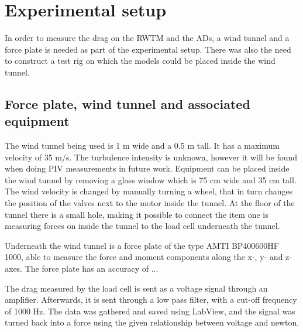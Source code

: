 \section{Experimental setup}

In order to measure the drag on the \gls{RWTM} and the \gls{AD}s, a wind tunnel and a force plate is needed as part of the experimental setup. There was also the need to construct a test rig on which the models could be placed inside the wind tunnel. 

\subsection{Force plate, wind tunnel and associated equipment}
The wind tunnel being used is 1 \si{\metre} wide and a 0.5 m tall. It has a maximum velocity of 35 m/s. The turbulence intensity is unknown, however it will be found when doing \gls{PIV} measurements in future work. Equipment can be placed inside the wind tunnel by removing a glass window which is 75 cm wide and 35 cm tall. The wind velocity is changed by manually turning a wheel, that in turn changes the position of the valves next to the motor inside the tunnel. At the floor of the tunnel there is a small hole, making it possible to connect the item one is measuring forces on inside the tunnel to the load cell underneath the tunnel.  


Underneath the wind tunnel is a force plate of the type AMTI BP400600HF 1000, able to measure the force and moment components along the x-, y- and z-axes. The force plate has an accuracy of ...  


The drag measured by the load cell is sent as a voltage signal through an amplifier. Afterwards, it is sent through a low pass filter, with a cut-off frequency of 1000 Hz. The data was gathered and saved using LabView, and the signal was turned back into a force using the given relationship between voltage and newton. 

